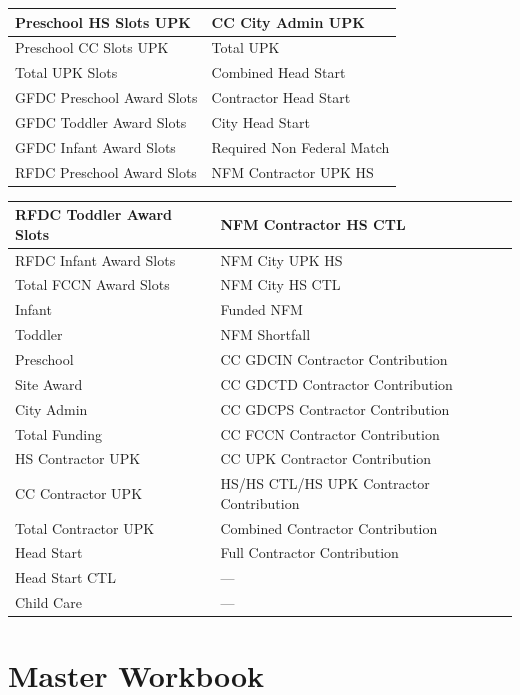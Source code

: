 \documentclass[12pt,a4paper]{report}
\begin{document}
\begin{center}
\begin{tabular}{|p{6.0cm}|p{6.0cm}|}
		Preschool HS Slots UPK & CC City Admin UPK \\ \hline
		Preschool CC Slots UPK & Total UPK \\ \hline
        Total UPK Slots & Combined Head Start \\ \hline
        GFDC Preschool Award Slots & Contractor Head Start \\ \hline
		GFDC Toddler Award Slots & City Head Start \\ \hline
		GFDC Infant Award Slots & Required Non Federal Match \\ \hline
        RFDC Preschool Award Slots & NFM Contractor UPK HS \\ \hline
        \end{tabular}
    \end{center}
    \begin{center}
        \begin{tabular}{|p{5.0cm}|p{7.0cm}|}
		\hline
		RFDC Toddler Award Slots & NFM Contractor HS CTL \\ \hline
		RFDC Infant Award Slots & NFM City UPK HS \\ \hline
        Total FCCN Award Slots & NFM City HS CTL \\ \hline
        Infant & Funded NFM \\ \hline
		Toddler & NFM Shortfall \\ \hline
		Preschool & CC GDCIN Contractor Contribution \\ \hline
        Site Award & CC GDCTD Contractor Contribution \\ \hline
        City Admin & CC GDCPS Contractor Contribution \\ \hline
        Total Funding & CC FCCN Contractor Contribution  \\ \hline
        HS Contractor UPK & CC UPK Contractor Contribution \\ \hline
		CC Contractor UPK & HS/HS CTL/HS UPK Contractor Contribution \\ \hline
		Total Contractor UPK & Combined Contractor Contribution \\ \hline
        Head Start & Full Contractor  Contribution \\ \hline
		Head Start CTL & --- \\ \hline
        Child Care & --- \\ \hline
		\end{tabular}
    \end{center}

\chapter{Master Workbook}
\end{document}
